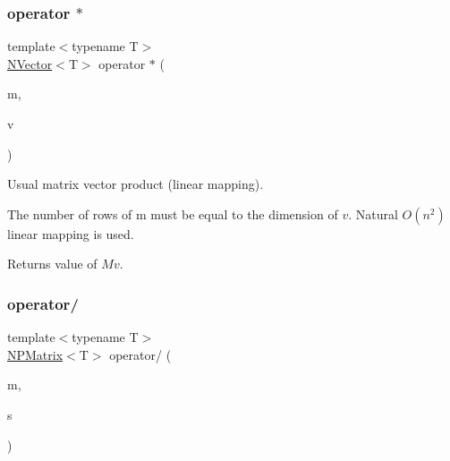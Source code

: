 \subsubsection{\texorpdfstring{operator $\ast$}{operator *}\hspace{0.1cm}{\footnotesize\ttfamily [4/4]}}
{\footnotesize\ttfamily template$<$typename T$>$ \\
\mbox{\hyperlink{class_n_vector}{N\+Vector}}$<$T$>$ operator $\ast$ (\begin{DoxyParamCaption}\item[{const \mbox{\hyperlink{class_n_p_matrix}{N\+P\+Matrix}}$<$ T $>$ \&}]{m,  }\item[{\mbox{\hyperlink{class_n_vector}{N\+Vector}}$<$ T $>$}]{v }\end{DoxyParamCaption})\hspace{0.3cm}{\ttfamily [friend]}}



Usual matrix vector product (linear mapping). 

The number of rows of m must be equal to the dimension of $ v $. Natural $ O(n^2) $ linear mapping is used. \begin{DoxyReturn}{Returns}
value of $ M v $. 
\end{DoxyReturn}
\mbox{\label{class_n_p_matrix_ae976e53eca81caea13a8e077ced70d68}} 
\subsubsection{\texorpdfstring{operator/}{operator/}\hspace{0.1cm}{\footnotesize\ttfamily [1/2]}}
{\footnotesize\ttfamily template$<$typename T$>$ \\
\mbox{\hyperlink{class_n_p_matrix}{N\+P\+Matrix}}$<$T$>$ operator/ (\begin{DoxyParamCaption}\item[{\mbox{\hyperlink{class_n_p_matrix}{N\+P\+Matrix}}$<$ T $>$}]{m,  }\item[{T}]{s }\end{DoxyParamCaption})\hspace{0.3cm}{\ttfamily [friend]}}

\mbox{\label{class_n_p_matrix_aaad3ba825a660b8019218ed6088c2cb7}} 
